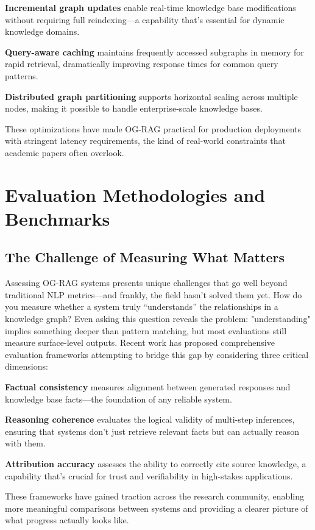 \textbf{Incremental graph updates} enable real-time knowledge base modifications without requiring full reindexing—a capability that's essential for dynamic knowledge domains.

\textbf{Query-aware caching} maintains frequently accessed subgraphs in memory for rapid retrieval, dramatically improving response times for common query patterns.

\textbf{Distributed graph partitioning} supports horizontal scaling across multiple nodes, making it possible to handle enterprise-scale knowledge bases.

These optimizations have made OG-RAG practical for production deployments with stringent latency requirements, the kind of real-world constraints that academic papers often overlook.

\section{Evaluation Methodologies and Benchmarks}

\subsection{The Challenge of Measuring What Matters}

Assessing OG-RAG systems presents unique challenges that go well beyond traditional NLP metrics—and frankly, the field hasn't solved them yet. How do you measure whether a system truly ``understands'' the relationships in a knowledge graph? Even asking this question reveals the problem: "understanding" implies something deeper than pattern matching, but most evaluations still measure surface-level outputs. Recent work has proposed comprehensive evaluation frameworks attempting to bridge this gap by considering three critical dimensions:

\textbf{Factual consistency} measures alignment between generated responses and knowledge base facts—the foundation of any reliable system.

\textbf{Reasoning coherence} evaluates the logical validity of multi-step inferences, ensuring that systems don't just retrieve relevant facts but can actually reason with them.

\textbf{Attribution accuracy} assesses the ability to correctly cite source knowledge, a capability that's crucial for trust and verifiability in high-stakes applications.

These frameworks have gained traction across the research community, enabling more meaningful comparisons between systems and providing a clearer picture of what progress actually looks like.

